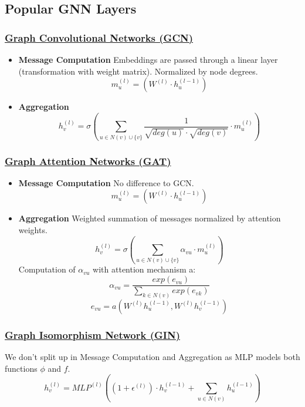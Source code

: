 \documentclass[parskip=full]{scrartcl}
\begin{document}
\subsection{Popular GNN Layers}

\subsubsection{\href{https://arxiv.org/pdf/1609.02907.pdf}{Graph Convolutional Networks (GCN)}}
\begin{itemize}
	\item[] \textbf{Message Computation}\newline
		Embeddings are passed through a linear layer (transformation with 		weight matrix). Normalized by node degrees.
		\[m_u^{(l)} = \left(W^{(l)} \cdot h_u^{(l-1)}\right)\]
	\item[] \textbf{Aggregation}\newline
		\[h_v^{(l)} = \sigma\left(\sum_{u \in N(v) \cup \{v\}} \frac{1}{\sqrt{deg(u)} \cdot \sqrt{deg(v)}} \cdot m_u^{(l)}\right)\]
\end{itemize}

\subsubsection{\href{https://arxiv.org/pdf/1710.10903.pdf}{Graph Attention Networks (GAT)}}
\begin{itemize}
	\item[] \textbf{Message Computation}\newline
		No difference to GCN.
		\[m_u^{(l)} = \left(W^{(l)} \cdot h_u^{(l-1)}\right)\]
	\item[] \textbf{Aggregation}\newline
		Weighted summation of messages normalized by attention weights.
		\[h_v^{(l)} = \sigma\left(\sum_{u \in N(v) \cup \{v\}} \alpha_{vu} \cdot m_u^{(l)}\right)\]
		Computation of $\alpha_{vu}$ with attention mechanism a:
		\[\alpha_{vu} = \frac{exp(e_{vu})}{\sum_{k \in N(v)} exp(e_{vk})}\]
		\[e_{vu} = a\left(W^{(l)}h_u^{(l-1)}, W^{(l)}h_v^{(l-1)}\right)\]
\end{itemize}

\subsubsection{\href{https://arxiv.org/pdf/1810.00826.pdf}{Graph Isomorphism Network (GIN)}}\label{GIN}
We don't split up in Message Computation and Aggregation as MLP models both functions $\phi$ and $f$.
\[h_v^{(l)} = MLP^{(l)}\left(\left(1 + \epsilon^{(l)}\right) \cdot h_v^{(l-1)} + \sum_{u \in N(v)} h_u^{(l-1)}\right)\]
\end{document}

